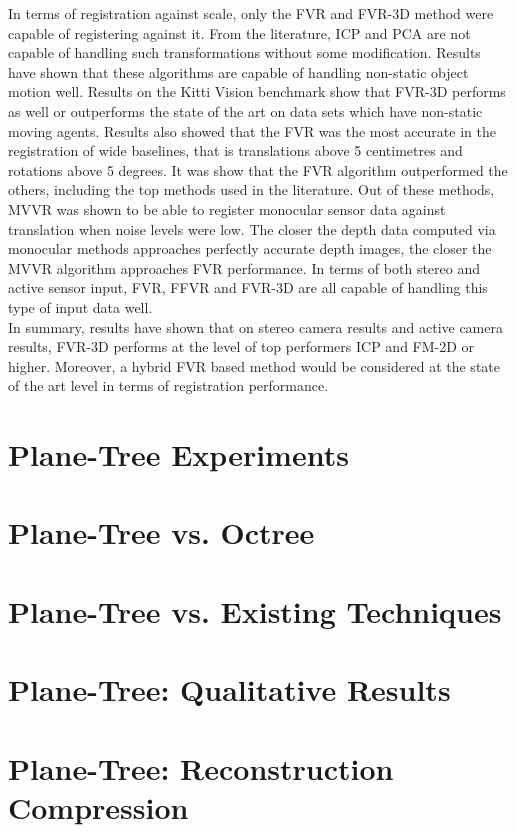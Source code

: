 In terms of registration against scale, only the FVR and FVR-3D method were capable of registering against it. From the literature, ICP and PCA are not capable of handling such transformations without some modification. Results have shown that these algorithms are capable of handling non-static object motion well. Results on the Kitti Vision benchmark show that FVR-3D performs as well or outperforms the state of the art on data sets which have non-static moving agents. Results also showed that the FVR was the most accurate in the registration of wide baselines, that is translations above 5 centimetres and rotations above 5 degrees. It was show that the FVR algorithm outperformed the others, including the top methods used in the literature. Out of these methods, MVVR was shown to be able to register monocular sensor data against translation when noise levels were low. The closer the depth data computed via monocular methods approaches perfectly accurate depth images, the closer the MVVR algorithm approaches FVR performance. In terms of both stereo and active sensor input, FVR, FFVR and FVR-3D are all capable of handling this type of input data well. \\

In summary, results have shown that on stereo camera results and active camera results, FVR-3D performs at the level of top performers ICP and FM-2D or higher. Moreover, a hybrid FVR based method would be considered at the state of the art level in terms of registration performance.  

\section{Plane-Tree Experiments}

\section{Plane-Tree vs. Octree}
\label{SEC:PTVSOT}

\section{Plane-Tree vs. Existing Techniques}
\label{SEC:PTVSSOTA}

\section{Plane-Tree: Qualitative Results}
\label{SEC:PTQUALEVAL}

\section{Plane-Tree: Reconstruction Compression}
\label{SEC:PTONRECON}





